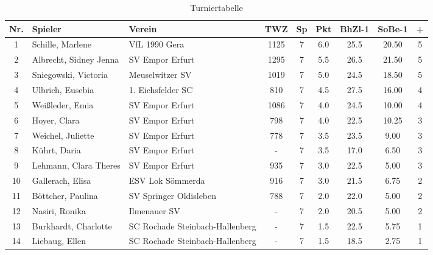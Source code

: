\begin{table}[H]
\centering
\begin{tabular}{|c|l|l|c|c|c|c|c|c|}
\hline
Nr. & Spieler & Verein & TWZ & Sp & Pkt & BhZl-1 & SoBe-1 & + \\ \hline
1 & Schille, Marlene & VfL 1990 Gera & 1125 & 7 & 6.0 & 25.5 & 20.50 & 5 \\
2 & Albrecht, Sidney Jenna & SV Empor Erfurt & 1295 & 7 & 5.5 & 26.5 & 21.50 & 5 \\
3 & Sniegowski, Victoria & Meuselwitzer SV & 1019 & 7 & 5.0 & 24.5 & 18.50 & 5 \\
4 & Ulbrich, Eusebia & 1. Eichsfelder SC & 810 & 7 & 4.5 & 27.5 & 16.00 & 4 \\
5 & Weißleder, Emia & SV Empor Erfurt & 1086 & 7 & 4.0 & 24.5 & 10.00 & 4 \\
6 & Hoyer, Clara & SV Empor Erfurt & 798 & 7 & 4.0 & 22.5 & 10.25 & 3 \\
7 & Weichel, Juliette & SV Empor Erfurt & 778 & 7 & 3.5 & 23.5 & 9.00 & 3 \\
8 & Kührt, Daria & SV Empor Erfurt & - & 7 & 3.5 & 17.0 & 6.50 & 3 \\
9 & Lehmann, Clara Theres & SV Empor Erfurt & 935 & 7 & 3.0 & 22.5 & 5.00 & 3 \\
10 & Gallerach, Elisa & ESV Lok Sömmerda & 916 & 7 & 3.0 & 21.5 & 6.75 & 2 \\
11 & Böttcher, Paulina & SV Springer Oldisleben & 788 & 7 & 2.0 & 22.0 & 5.00 & 2 \\
12 & Nasiri, Ronika & Ilmenauer SV & - & 7 & 2.0 & 20.5 & 5.00 & 2 \\
13 & Burkhardt, Charlotte & SC Rochade Steinbach-Hallenberg & - & 7 & 1.5 & 22.5 & 5.75 & 1 \\
14 & Liebaug, Ellen & SC Rochade Steinbach-Hallenberg & - & 7 & 1.5 & 18.5 & 2.75 & 1 \\ \hline
\end{tabular}
\caption{Turniertabelle}
\label{tab:turniertabelle}
\end{table}

